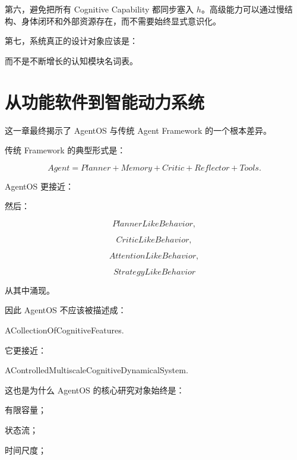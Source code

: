 第六，避免把所有 Cognitive Capability 都同步塞入 $h$。高级能力可以通过慢结构、身体闭环和外部资源存在，而不需要始终显式意识化。

第七，系统真正的设计对象应该是：

\begin{statementbox}
\centering
{}
\end{statementbox}

而不是不断增长的认知模块名词表。

\section{从功能软件到智能动力系统}

这一章最终揭示了 AgentOS 与传统 Agent Framework 的一个根本差异。

传统 Framework 的典型形式是：

\[
Agent
=
Planner
+
Memory
+
Critic
+
Reflector
+
Tools.
\]

AgentOS 更接近：

\begin{statementbox}
\centering
{}
\end{statementbox}

然后：

\[
PlannerLikeBehavior,
\]

\[
CriticLikeBehavior,
\]

\[
AttentionLikeBehavior,
\]

\[
StrategyLikeBehavior
\]

从其中涌现。

因此 AgentOS 不应该被描述成：

\begin{statementbox}
ACollectionOfCognitiveFeatures.
\end{statementbox}

它更接近：

\begin{statementbox}
AControlledMultiscaleCognitiveDynamicalSystem.
\end{statementbox}

这也是为什么 AgentOS 的核心研究对象始终是：

有限容量；

状态流；

时间尺度；


